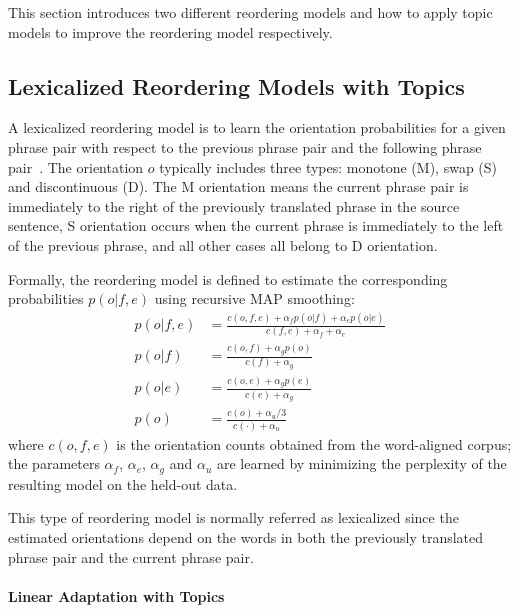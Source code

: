 This section introduces two different reordering models and how to apply topic models to improve the reordering model respectively.


\subsection{Lexicalized Reordering Models with Topics}

A lexicalized reordering model is to learn the orientation probabilities for a given phrase pair with respect to the previous phrase pair and the following phrase pair~\citep{Chen-2013}. The orientation $o$ typically includes three types: monotone (M), swap (S) and discontinuous (D). The M orientation means the current phrase pair is immediately to the right of the previously translated phrase in the source sentence, S orientation occurs when the current phrase is immediately to the left of the previous phrase, and all other cases all belong to D orientation. 

Formally, the reordering model is defined to estimate the corresponding probabilities $p(o|f,e)$ using recursive MAP smoothing:
\begin{align}
p(o|f,e) &= \frac{c(o,f,e) + \alpha_f p(o|f) + \alpha_e p(o|e)}{c(f,e) + \alpha_f + \alpha_e} \\
p(o|f) &= \frac{c(o,f) + \alpha_g p(o)}{c(f) + \alpha_g} \\
p(o|e) &= \frac{c(o,e) + \alpha_g p(e)}{c(e) + \alpha_g} \\
p(o) &= \frac{c(o) + \alpha_u/3}{c(\cdot) + \alpha_u}
\end{align}
where $c(o,f,e)$ is the orientation counts obtained from the word-aligned corpus;  the parameters $\alpha_f$, $\alpha_e$, $\alpha_g$ and $\alpha_u$ are learned by minimizing the perplexity of the resulting model on the held-out data.

This type of reordering model is normally referred as lexicalized since the estimated orientations depend on the words in both the previously translated phrase pair and the current phrase pair. 

\paragraph{Linear Adaptation with Topics}


